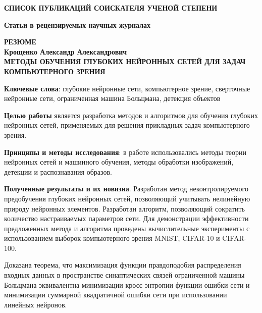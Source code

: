 \documentclass{thesisby}
\begin{document}
\medskip




\def\selectlanguageifdefined#1{
\expandafter\ifx\csname date#1\endcsname\relax
\else\language\csname l@#1\endcsname\fi}

\bigskip
\centerline{\bf СПИСОК ПУБЛИКАЦИЙ СОИСКАТЕЛЯ УЧЕНОЙ СТЕПЕНИ}

\vspace{1mm}
{\bf Статьи в рецензируемых научных журналах}
\vspace{2mm}

\begin{enumerate}[wide, labelindent=10mm]



\end{enumerate}

\newpage
\begin{center}
\bf РЕЗЮМЕ
\\[1mm]\rm Крощенко Александр Александрович\\[1mm] \bf
МЕТОДЫ ОБУЧЕНИЯ ГЛУБОКИХ НЕЙРОННЫХ СЕТЕЙ ДЛЯ ЗАДАЧ КОМПЬЮТЕРНОГО ЗРЕНИЯ
 \end{center}

{\bf Ключевые слова}: глубокие нейронные сети, компьютерное зрение, сверточные нейронные сети, ограниченная машина Больцмана, детекция объектов

\textbf{Целью работы} является разработка методов и алгоритмов для обучения глубоких нейронных сетей, применяемых для решения прикладных задач компьютерного зрения.

\textbf{Принципы и методы исследования}: в работе использовались методы теории нейронных сетей и машинного обучения, методы обработки изображений, детекции и распознавания образов.

\textbf{Полученные результаты и их новизна}.
Разработан метод неконтролируемого предобучения глубоких нейронных сетей, позволяющий учитывать нелинейную природу нейронных элементов. Разработан алгоритм, позволяющий сократить количество настраиваемых параметров сети. Для демонстрации эффективности предложенных метода и алгоритма проведены вычислительные эксперименты с использованием выборок компьютерного зрения MNIST, CIFAR-10 и CIFAR-100.

Доказана теорема, что максимизация функции правдоподобия распределения входных данных в пространстве синаптических связей ограниченной машины Больцмана эквивалентна минимизации кросс-энтропии функции ошибки сети и минимизации суммарной квадратичной ошибки сети при использовании линейных нейронов.
\end{document}
